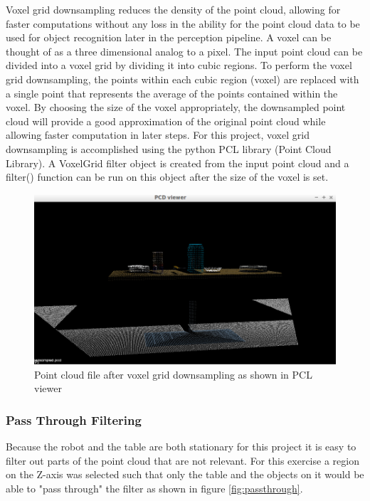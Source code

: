 \documentclass{article}
\begin{document}
Voxel grid downsampling reduces the density of the point cloud, allowing for faster computations without any loss in the ability for the point cloud data to be used for object recognition later in the perception pipeline. A voxel can be thought of as a three dimensional analog to a pixel. The input point cloud can be divided into a voxel grid by dividing it into cubic regions. To perform the voxel grid downsampling, the points within each cubic region (voxel) are replaced with a single point that represents the average of the points contained within the voxel. By choosing the size of the voxel appropriately, the downsampled point cloud will provide a good approximation of the original point cloud while allowing faster computation in later steps.
For this project, voxel grid downsampling is accomplished using the python PCL library (Point Cloud Library). A VoxelGrid filter object is created from the input point cloud and a filter() function can be run on this object after the size of the voxel is set.

\begin{figure}[H]
    \includegraphics[width=\linewidth]{ex1downsampled.png}
    \caption{Point cloud file after voxel grid downsampling as shown in PCL viewer}
    \label{fig:downsampled}
\end{figure}

\subsubsection{Pass Through Filtering}
Because the robot and the table are both stationary for this project it is easy to filter out parts of the point cloud that are not relevant. For this exercise a region on the Z-axis was selected such that only the table and the objects on it would be able to "pass through" the filter as shown in figure \ref{fig:passthrough}.
\end{document}
